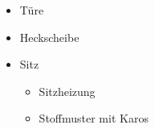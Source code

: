   \begin{itemize}
    \item Türe
    \item Heckscheibe
    \item Sitz
      \begin{itemize}
        \item Sitzheizung
        \item Stoffmuster mit Karos
      \end{itemize}
  \end{itemize}
